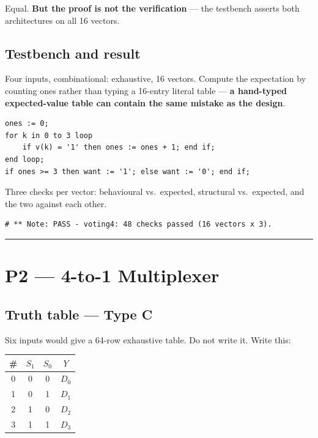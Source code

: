 \documentclass[11pt]{article}
\newcommand{\hr}{\vspace{2pt}\hrule\vspace{6pt}}
\begin{document}
Equal. \textbf{But the proof is not the verification} --- the testbench asserts
both architectures on all 16 vectors.

\subsection*{Testbench and result}

Four inputs, combinational: exhaustive, 16 vectors. Compute the expectation by
counting ones rather than typing a 16-entry literal table --- \textbf{a hand-typed
expected-value table can contain the same mistake as the design}.

\begin{lstlisting}
ones := 0;
for k in 0 to 3 loop
    if v(k) = '1' then ones := ones + 1; end if;
end loop;
if ones >= 3 then want := '1'; else want := '0'; end if;
\end{lstlisting}

Three checks per vector: behavioural vs.\ expected, structural vs.\ expected, and
the two against each other.

\begin{lstlisting}
# ** Note: PASS - voting4: 48 checks passed (16 vectors x 3).
\end{lstlisting}

\vspace{4pt}\hr

\section*{P2 --- 4-to-1 Multiplexer}

\subsection*{Truth table --- Type C}

Six inputs would give a 64-row exhaustive table. Do not write it. Write this:

\begin{center}
\begin{tabular}{c|cc|c}
\toprule
\# & $S_1$ & $S_0$ & $Y$ \\
\midrule
0 & 0 & 0 & $D_0$ \\
1 & 0 & 1 & $D_1$ \\
2 & 1 & 0 & $D_2$ \\
3 & 1 & 1 & $D_3$ \\
\bottomrule
\end{tabular}
\end{center}
\end{document}

